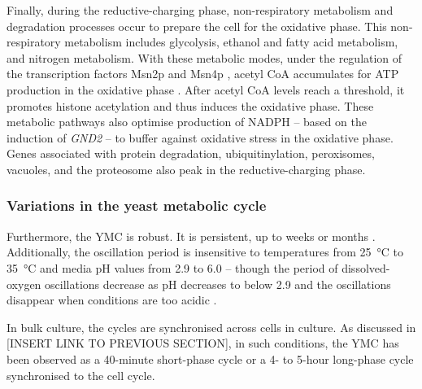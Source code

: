 Finally, during the reductive-charging phase,
non-respiratory metabolism and degradation processes occur to prepare the cell for the oxidative phase.
This non-respiratory metabolism includes glycolysis, ethanol and fatty acid metabolism, and nitrogen metabolism.
With these metabolic modes, under the regulation of the transcription factors Msn2p and Msn4p \citep{kuangMsn2RegulateExpression2017}, acetyl CoA accumulates for ATP production in the oxidative phase \citep{tuLogicYeastMetabolic2005}.
After acetyl CoA levels reach a threshold, it promotes histone acetylation and thus induces the oxidative phase.
These metabolic pathways also optimise production of NADPH -- based on the induction of \emph{GND2} -- to buffer against oxidative stress in the oxidative phase.
Genes associated with protein degradation, ubiquitinylation, peroxisomes, vacuoles, and the proteosome also peak in the reductive-charging phase.

\subsubsection{Variations in the yeast metabolic cycle} %
\label{subsubsec:intro-ymc-definition-variation}

Furthermore, the YMC is robust.
It is persistent, up to weeks or months \citep{lloydRedoxRhythmicityClocks2007}.
Additionally, the oscillation period is insensitive to temperatures from \SI{25}{\celsius} to \SI{35}{\celsius} and media pH values from
2.9 to 6.0 \citep{lloydUltradianMetronomeTimekeeper2005} -- though the period of dissolved-oxygen oscillations decrease as pH decreases to below 2.9 and the oscillations disappear when conditions are too acidic \citep{oneillEukaryoticCellBiology2020}.

In bulk culture, the cycles are synchronised across cells in culture.
As discussed in [INSERT LINK TO PREVIOUS SECTION], in such conditions, the YMC has been observed as a 40-minute short-phase cycle or a 4- to 5-hour long-phase cycle synchronised to the cell cycle.


